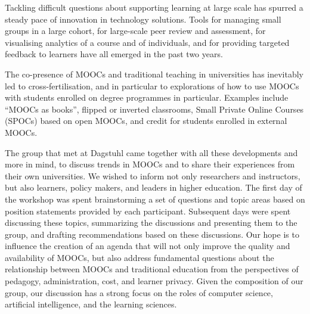 Tackling difficult questions about supporting learning
at large scale has spurred a steady pace of innovation in
technology solutions.  Tools for managing small groups in a large
cohort, for large-scale peer review and assessment, for visualising
analytics of a course and of individuals, and for providing targeted
feedback 
to learners have all emerged in the past two years.  

The co-presence of MOOCs and traditional teaching in universities has
inevitably led to cross-fertilisation, and in particular to explorations
of how to use MOOCs with students enrolled on degree programmes in
particular.  Examples include ``MOOCs as books'', flipped or inverted
classrooms, Small Private Online Courses (SPOCs) based on open MOOCs,
and credit for students enrolled in external MOOCs.

The group that met at Dagstuhl came together with all these
developments and more in mind, to discuss trends in MOOCs and to share
their experiences from their own universities.  
We wished to inform not only researchers and instructors, but also
learners, policy makers, and leaders in higher education.  The first day
of the workshop was spent brainstorming a set of questions and topic
areas based on position statements provided by each participant.
Subsequent days were spent discussing these topics, summarizing the
discussions and presenting them to the group, and drafting
recommendations based on these discussions.
Our hope is to 
influence the creation of an agenda that will not only improve the
quality and availability of MOOCs,
but also address fundamental questions about the relationship between
MOOCs and traditional education from the perspectives of pedagogy,
administration, cost, and learner privacy.
Given the composition of our group, our discussion has a strong focus on the
roles of computer science, artificial intelligence, and the learning sciences.


